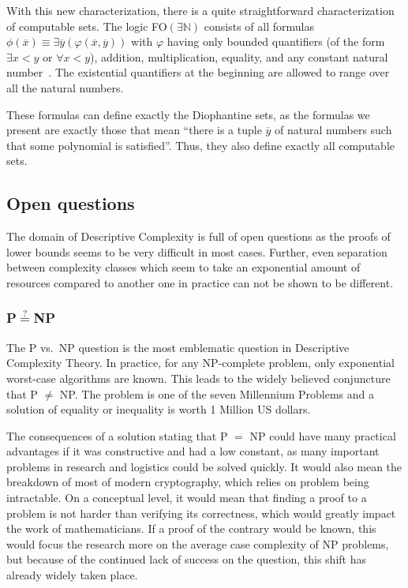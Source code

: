 With this new characterization, there is a quite straightforward characterization of computable sets.
The logic FO$(\exists \mathbb{N})$ consists of all formulas $\phi(\overline{x}) \equiv \exists \overline{y} (\varphi(\overline{x}, \overline{y}))$ with $\varphi$ having only bounded quantifiers (of the form $\exists x < y$ or $\forall x < y$), addition, multiplication, equality, and any constant natural number~\cite{Entropy2020}.
The existential quantifiers at the beginning are allowed to range over all the natural numbers.

These formulas can define exactly the Diophantine sets, as the formulas we present are exactly those that mean ``there is a tuple $\overline{y}$ of natural numbers such that some polynomial is satisfied''.
Thus, they also define exactly all computable sets.

\subsection{Open questions}\label{subsec:open-questions}

The domain of Descriptive Complexity is full of open questions as the proofs of lower bounds seems to be very difficult in most cases.
Further, even separation between complexity classes which seem to take an exponential amount of resources compared to another one in practice can not be shown to be different.

\subsubsection{P$\overset{?}{=}$NP}\label{subsubsec:pnp}
The P vs.~NP question is the most emblematic question in Descriptive Complexity Theory.
In practice, for any NP-complete problem, only exponential worst-case algorithms are known.
This leads to the widely believed conjuncture that P $\neq$ NP\@.
The problem is one of the seven Millennium Problems and a solution of equality or inequality is worth 1 Million US dollars.

The consequences of a solution stating that P $=$ NP could have many practical advantages if it was constructive and had a low constant, as many important problems in research and logistics could be solved quickly.
It would also mean the breakdown of most of modern cryptography, which relies on problem being intractable.
On a conceptual level, it would mean that finding a proof to a problem is not harder than verifying its correctness, which would greatly impact the work of mathematicians.
If a proof of the contrary would be known, this would focus the research more on the average case complexity of NP problems, but because of the continued lack of success on the question, this shift has already widely taken place.

